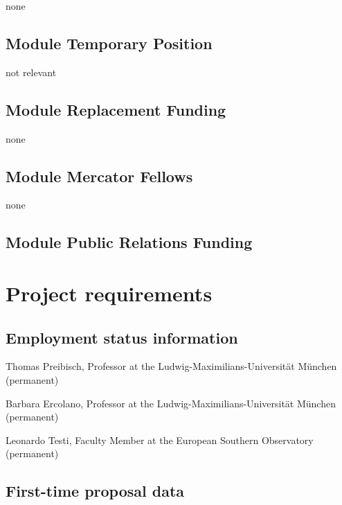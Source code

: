 \documentclass[10pt,fleqn,twoside]{article}
\begin{document}
none

\subsection{Module Temporary Position}

not relevant

\subsection{Module Replacement Funding}

none

\subsection{Module Mercator Fellows}

none

\subsection{Module Public Relations Funding}



\section{Project requirements}
\renewcommand{\leftmark}{\sc Project requirements}

\subsection{Employment status information}

Thomas Preibisch, Professor at the Ludwig-Maximilians-Universit\"at M\"unchen  (permanent)

Barbara Ercolano, Professor at the Ludwig-Maximilians-Universit\"at M\"unchen  (permanent)

Leonardo Testi, Faculty Member at the European Southern Observatory  (permanent)

\subsection{First-time proposal data}
\end{document}
